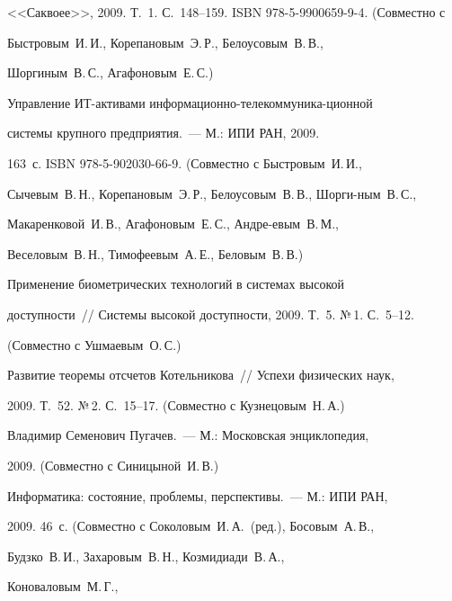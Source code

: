 <<Саквоее>>, 2009. Т.~1. С.~148--159. ISBN 978-5-9900659-9-4. (Совместно с


Быстровым~И.\,И., Корепановым~Э.\,Р., Белоусовым~В.\,В.,


Шоргиным~В.\,С., Агафоновым~Е.\,С.)





 Управление ИТ-активами информационно-те\-ле\-ком\-му\-ни\-ка-\linebreak ци\-он\-ной


системы крупного предприятия.~--- М.: ИПИ РАН, 2009.


 163~с. ISBN 978-5-902030-66-9. (Совместно с Быстровым~И.\,И.,


Сычевым~В.\,Н., Корепановым~Э.\,Р., Белоусовым~В.\,В., Шорги-\linebreak ным~В.\,С.,


Макаренковой~И.\,В., Агафоновым~Е.\,С., Андре-\linebreak евым~В.\,М.,


Веселовым~В.\,Н., Тимофеевым~А.\,Е., Беловым~В.\,В.)





 Применение биометрических технологий в системах высокой


доступности~// Системы высокой доступности, 2009. Т.~5. №\,1. С.~5--12.


(Совместно с Ушмаевым~О.\,С.)





 Развитие теоремы отсчетов Котельникова~// Успехи физических наук,


2009. Т.~52. №\,2. С.~15--17. (Совместно с Кузнецовым~Н.\,А.)





 Владимир Семенович Пугачев.~--- М.: Московская энциклопедия,


2009. (Совместно с Синицыной~И.\,В.)


\pagebreak





 Информатика: состояние, проблемы, перспективы.~--- М.: ИПИ РАН,


2009. 46~с. (Совместно с Соколовым~И.\,А.\ (ред.), Босовым~А.\,В.,


Будзко~В.\,И., Захаровым~В.\,Н., Козмидиади~В.\,А.,\linebreak


 Коноваловым~М.\,Г.,


